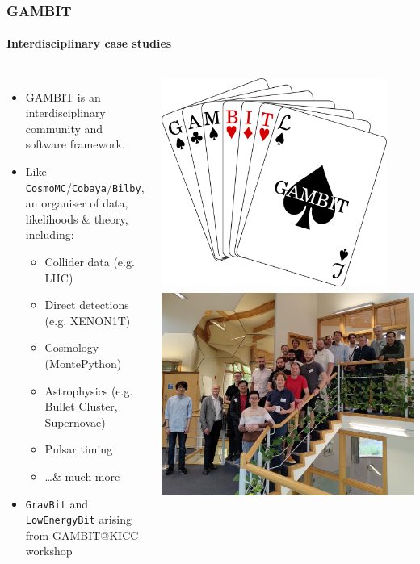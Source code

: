 \documentclass[aspectratio=169, handout]{beamer}
\begin{document}
\begin{frame}
    \frametitle{GAMBIT}
    \framesubtitle{Interdisciplinary case studies}
    \begin{columns}
        \begin{itemize}
            \item GAMBIT is an interdisciplinary community and software framework.
            \item Like \texttt{CosmoMC}/\texttt{Cobaya}/\texttt{Bilby}, an organiser of data, likelihoods \& theory, including:
                \begin{itemize}
                    \item Collider data (e.g. LHC)
                    \item Direct detections (e.g. XENON1T)
                    \item Cosmology (MontePython)
                    \item Astrophysics (e.g. Bullet Cluster, Supernovae)
                    \item Pulsar timing
                    \item \ldots \& much more
                \end{itemize}
            \item \texttt{GravBit} and \texttt{LowEnergyBit} arising from GAMBIT@KICC workshop
        \end{itemize}
        \includegraphics[height=0.423\textwidth]{figures/students/gambit.png}
        \includegraphics[height=0.423\textwidth]{figures/gambit_kicc.jpg}

\end{columns}
\end{frame}
\end{document}
